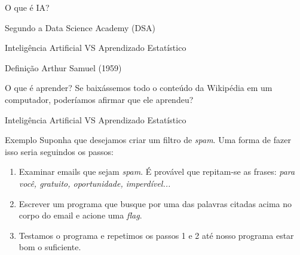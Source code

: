 \begin{frame}{O que é IA?}
	\begin{block}{Segundo a Data Science Academy (DSA)}
		\justifying
	\end{block}
\end{frame}

\begin{frame}{Inteligência Artificial VS Aprendizado Estatístico}
	\begin{block}{Definição}
		\justifying
		Arthur Samuel (1959)
	\end{block}
	\begin{block}{O que é aprender?}
		Se baixássemos todo o conteúdo da Wikipédia em um computador, poderíamos afirmar que ele aprendeu?
	\end{block}
\end{frame}

\begin{frame}{Inteligência Artificial VS Aprendizado Estatístico}
	\begin{block}{Exemplo}
		\justifying
		Suponha que desejamos criar um filtro de \textit{spam}.
		Uma forma de fazer isso seria seguindos os passos:
		\begin{enumerate}
			\justifying
			\item Examinar emails que sejam \textit{spam}.
			É provável que repitam-se as frases: \textit{para você, gratuito, oportunidade, imperdível...}
			\item Escrever um programa que busque por uma das palavras citadas acima no corpo do email e acione uma \textit{flag}.
			\item Testamos o programa e repetimos os passos 1 e 2 até nosso programa estar bom o suficiente. 
		\end{enumerate}
	\end{block}
\end{frame}

